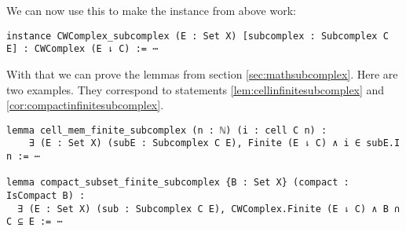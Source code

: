We can now use this to make the instance from above work: 

\begin{lstlisting}
instance CWComplex_subcomplex (E : Set X) [subcomplex : Subcomplex C E] : CWComplex (E ⇂ C) := ⋯
\end{lstlisting}

With that we can prove the lemmas from section \ref{sec:mathsubcomplex}. 
Here are two examples.
They correspond to statements \ref{lem:cellinfinitesubcomplex} and \ref{cor:compactinfinitesubcomplex}.

\begin{lstlisting}
lemma cell_mem_finite_subcomplex (n : ℕ) (i : cell C n) :
    ∃ (E : Set X) (subE : Subcomplex C E), Finite (E ⇂ C) ∧ i ∈ subE.I n := ⋯

lemma compact_subset_finite_subcomplex {B : Set X} (compact : IsCompact B) :
  ∃ (E : Set X) (sub : Subcomplex C E), CWComplex.Finite (E ⇂ C) ∧ B ∩ C ⊆ E := ⋯
\end{lstlisting}